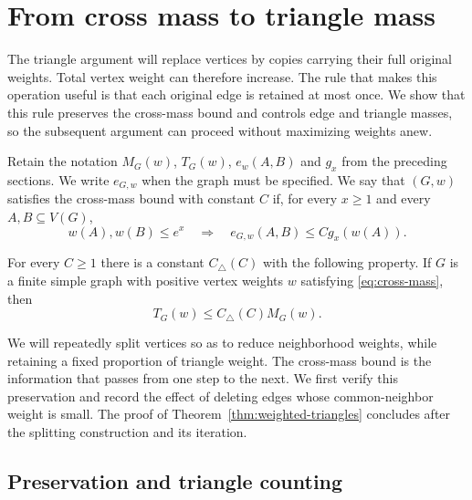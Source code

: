 \section{From cross mass to triangle mass}
\label{sec:triangle}

The triangle argument will replace vertices by copies carrying their full
original weights. Total vertex weight can therefore increase. The rule
that makes this operation useful is that each original edge is retained
at most once. We show that this rule preserves the cross-mass bound and
controls edge and triangle masses, so the subsequent argument can proceed
without maximizing weights anew.

Retain the notation $M_G(w)$, $T_G(w)$, $e_w(A,B)$ and $g_x$
from the preceding sections. We write $e_{G,w}$ when the graph must
be specified. We say that $(G,w)$ satisfies
the cross-mass bound with constant $C$ if, for every $x\ge1$ and every
$A,B\subseteq V(G)$,
\begin{equation}
 \label{eq:cross-mass}
 w(A),w(B)\le e^x
 \quad\Longrightarrow\quad
 e_{G,w}(A,B)\le Cg_x(w(A)).
\end{equation}

\begin{theorem}
\label{thm:weighted-triangles}
For every $C\ge1$ there is a constant $C_{\triangle}(C)$ with the
following property.  If $G$ is a finite simple graph with positive
vertex weights $w$ satisfying \eqref{eq:cross-mass}, then
\[
 T_G(w)\le C_{\triangle}(C)M_G(w).
\]
\end{theorem}

We will repeatedly split vertices so as to reduce neighborhood weights,
while retaining a fixed proportion of triangle weight.  The cross-mass
bound is the information that passes from one step to the next.  We first
verify this preservation and record the effect of deleting edges whose
common-neighbor weight is small.  The proof of
Theorem~\ref{thm:weighted-triangles} concludes after the splitting
construction and its iteration.

\subsection{Preservation and triangle counting}


